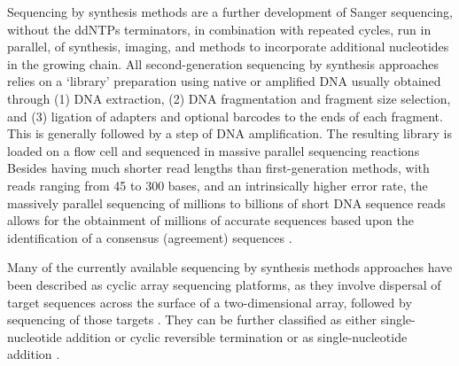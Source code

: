 Sequencing by synthesis methods are a further development of Sanger sequencing, without the ddNTPs terminators, in combination with repeated cycles, run in parallel, of synthesis, imaging, and methods to incorporate additional nucleotides in the growing chain. All second-generation sequencing by synthesis approaches relies on a ‘library’ preparation using native or amplified DNA usually obtained through (1) DNA extraction, (2) DNA fragmentation and fragment size selection, and (3) ligation of adapters and optional barcodes to the ends of each fragment. This is generally followed by a step of DNA amplification. The resulting library is loaded on a flow cell and sequenced in massive parallel sequencing reactions \citep{giani_long_2020}
Besides having much shorter read lengths than first-generation methods, with reads ranging from 45 to 300 bases, and an intrinsically higher error rate, the massively parallel sequencing of millions to billions of short DNA sequence reads allows for the obtainment of millions of accurate sequences based upon the identification of a consensus (agreement) sequences \citep{slatko_overview_2018, goodwin_coming_2016, hagemann_overview_2015}. 

Many of the currently available sequencing by synthesis methods approaches have been described as cyclic array sequencing platforms, as they involve dispersal of target sequences across the surface of a two-dimensional array, followed by sequencing of those targets \citep{hagemann_overview_2015}. They can be further classified as either single-nucleotide addition or cyclic reversible termination or as single-nucleotide addition \citep{goodwin_coming_2016}. 


